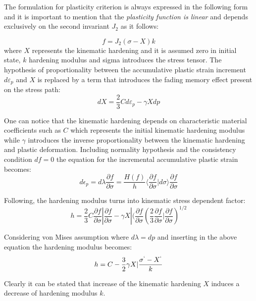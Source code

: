 \documentclass[12pt,a4paper]{report}
\begin{document}
The formulation for plasticity criterion is always expressed in the following form and it is important to mention that the\textit{ plasticity function is linear} and depends exclusively on the second invariant $J_2$ as it follows:

\begin{equation}
	f=J_2(\sigma-X)k
\end{equation}
where $X$ represents the kinematic hardening and it is assumed zero in initial state, $k$ hardening modulus and sigma introduces the stress tensor. The hypothesis of proportionality between the accumulative plastic strain increment $d\varepsilon_p$ and $X$ is replaced by a term that introduces the fading memory effect present on the stress path:
\begin{equation}
	dX=\frac{2}{3}Cd\varepsilon_p - \gamma Xdp
\end{equation}

One can notice that the kinematic hardening depends on characteristic material coefficients such as $C$ which represents the initial kinematic hardening modulus while $\gamma$ introduces the inverse proportionality between the kinematic hardening and plastic deformation. Including normality hypothesis and the consistency condition $df=0$ the equation for the incremental accumulative plastic strain becomes:
\begin{equation}
	d\epsilon_p=d\lambda\frac{\partial f}{\partial \sigma}=\frac{H(f)}{h}\langle\frac{\partial f}{\partial \sigma}|d\sigma \rangle \frac{\partial f}{\partial\sigma}
\end{equation}

Following, the hardening modulus turns into kinematic stress dependent factor:
\begin{equation}
	h=\frac{2}{3}C \frac{\partial f}{\partial\sigma}|\frac{\partial f}{\partial\sigma} - \gamma X | (\frac{\partial f}{\partial\sigma}(\frac{2}{3}\frac{\partial f}{\partial\sigma}|\frac{\partial f}{\partial\sigma})^{1/2}
\end{equation}

Considering von Mises assumption where $d\lambda =dp$ and inserting in the above equation the hardening modulus becomes:
\begin{equation}
h=C-\frac{3}{2}\gamma X|\frac{\sigma^` - X^`}{k}
\end{equation}

Clearly it can be stated that increase of the kinematic hardening $X$ induces a decrease of hardening modulus $k$. 
\end{document}
